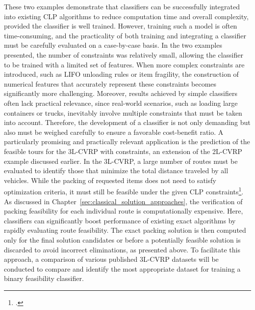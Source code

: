 These two examples demonstrate that classifiers can be successfully integrated into existing \gls{CLP}
algorithms to reduce computation time and overall complexity, provided the classifier is well trained.
However, training such a model is often time-consuming, and the practicality of both training and
integrating a classifier must be carefully evaluated on a case-by-case basis.
In the two examples presented, the number of constraints was relatively small, allowing the classifier
to be trained with a limited set of features. When more complex constraints are introduced, such as
\gls{LIFO} unloading rules or item fragility, the construction of numerical features that accurately
represent these constraints becomes significantly more challenging.
Moreover, results achieved by simple classifiers often lack practical relevance, since real-world
scenarios, such as loading large containers or trucks, inevitably involve multiple constraints that
must be taken into account. Therefore, the development of a classifier is not only demanding but also
must be weighed carefully to ensure a favorable cost-benefit ratio.
A particularly promising and practically relevant application is the prediction of the feasible tours for the
\gls{3L-CVRP} with constraints, an extension of the \gls{2L-CVRP} example discussed earlier. In the
\gls{3L-CVRP}, a large number of routes must be evaluated to identify those that minimize the total
distance traveled by all vehicles. While the packing of requested items does not need to satisfy
optimization criteria, it must still be feasible under the given \gls{CLP} constraints\footcite[cf.][]{tamke_branch-and-cut_2024}.
As discussed in Chapter~\ref{sec:classical_solution_approaches}, the verification of
packing feasibility for each individual route is computationally expensive.
Here, classifiers can significantly boost performance of existing exact algorithms by rapidly evaluating route feasibility. The
exact packing solution is then computed only for the final solution candidates or before a potentially
feasible solution is discarded to avoid incorrect eliminations, as presented above.
To facilitate this approach, a comparison of various published \gls{3L-CVRP} datasets will be conducted
to compare and identify the most appropriate dataset for training a binary feasibility classifier.